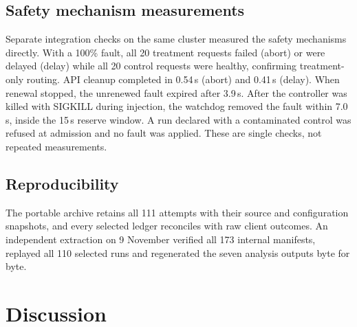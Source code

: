 \documentclass[a4paper,fleqn,11pt]{cas-dc}
\begin{document}
\subsection{Safety mechanism measurements}
Separate integration checks on the same cluster measured the safety mechanisms directly. With a 100\% fault, all 20 treatment requests failed (abort) or were delayed (delay) while all 20 control requests were healthy, confirming treatment-only routing. API cleanup completed in 0.54\,s (abort) and 0.41\,s (delay). When renewal stopped, the unrenewed fault expired after 3.9\,s. After the controller was killed with SIGKILL during injection, the watchdog removed the fault within 7.0\,s, inside the 15\,s reserve window. A run declared with a contaminated control was refused at admission and no fault was applied. These are single checks, not repeated measurements.


\subsection{Reproducibility}
The portable archive retains all 111 attempts with their source and configuration snapshots, and every selected ledger reconciles with raw client outcomes. An independent extraction on 9 November verified all 173 internal manifests, replayed all 110 selected runs and regenerated the seven analysis outputs byte for byte.

\FloatBarrier

\section{Discussion}\label{sec:discussion}
\end{document}
